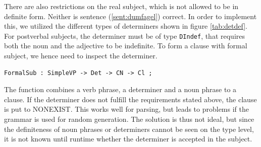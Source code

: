 \documentclass{report}
\begin{document}
There are also restrictions on the real subject, which is not allowed to be in
definite form.
Neither is sentence (\ref{sent:dumfagel}) correct.
\label{sent:dumfagel}
In order to implement this, we utilized the 
different types of determiners shown in figure \ref{tab:detdef}. 
For postverbal subjects, the determiner must be of type \verb-DIndef-,
that requires both the noun and the adjective to be indefinite.
%
To form a clause with formal subject, we hence need to inspect the determiner.
\begin{verbatim}
FormalSub : SimpleVP -> Det -> CN -> Cl ;
\end{verbatim}
The function combines a verb phrase, a determiner and a noun phrase to a clause.
If the determiner does not fulfill the requirements stated above, the clause is
put to NONEXIST.
This works well for parsing, but leads to problems if the grammar is used
for random generation. The solution is thus not ideal,
but since the definiteness of noun phrases or determiners cannot be seen on the
type level, it is not known until runtime whether the determiner is accepted
in the subject.
\end{document}
